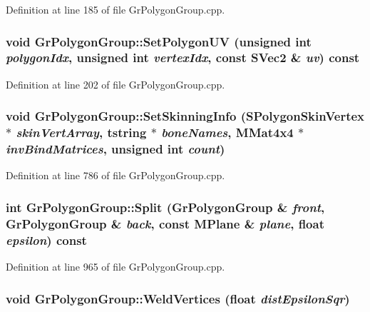 Definition at line 185 of file GrPolygonGroup.cpp.\hypertarget{class_gr_polygon_group_33200fb9c4556c940a842f9504bd2a85}{
\subsubsection[{SetPolygonUV}]{\setlength{\rightskip}{0pt plus 5cm}void GrPolygonGroup::SetPolygonUV (unsigned int {\em polygonIdx}, \/  unsigned int {\em vertexIdx}, \/  const {\bf SVec2} \& {\em uv}) const}}
\label{class_gr_polygon_group_33200fb9c4556c940a842f9504bd2a85}




Definition at line 202 of file GrPolygonGroup.cpp.\hypertarget{class_gr_polygon_group_04f5e9959c34e61726e25ff80d120989}{
\subsubsection[{SetSkinningInfo}]{\setlength{\rightskip}{0pt plus 5cm}void GrPolygonGroup::SetSkinningInfo ({\bf SPolygonSkinVertex} $\ast$ {\em skinVertArray}, \/  {\bf tstring} $\ast$ {\em boneNames}, \/  {\bf MMat4x4} $\ast$ {\em invBindMatrices}, \/  unsigned int {\em count})}}
\label{class_gr_polygon_group_04f5e9959c34e61726e25ff80d120989}




Definition at line 786 of file GrPolygonGroup.cpp.\hypertarget{class_gr_polygon_group_740ca90b8b5492d1da5b4195d9f2e82c}{
\subsubsection[{Split}]{\setlength{\rightskip}{0pt plus 5cm}int GrPolygonGroup::Split ({\bf GrPolygonGroup} \& {\em front}, \/  {\bf GrPolygonGroup} \& {\em back}, \/  const {\bf MPlane} \& {\em plane}, \/  float {\em epsilon}) const}}
\label{class_gr_polygon_group_740ca90b8b5492d1da5b4195d9f2e82c}




Definition at line 965 of file GrPolygonGroup.cpp.\hypertarget{class_gr_polygon_group_e361b892b9d9a739c82679e67eb689e7}{
\subsubsection[{WeldVertices}]{\setlength{\rightskip}{0pt plus 5cm}void GrPolygonGroup::WeldVertices (float {\em distEpsilonSqr})}}
\label{class_gr_polygon_group_e361b892b9d9a739c82679e67eb689e7}




